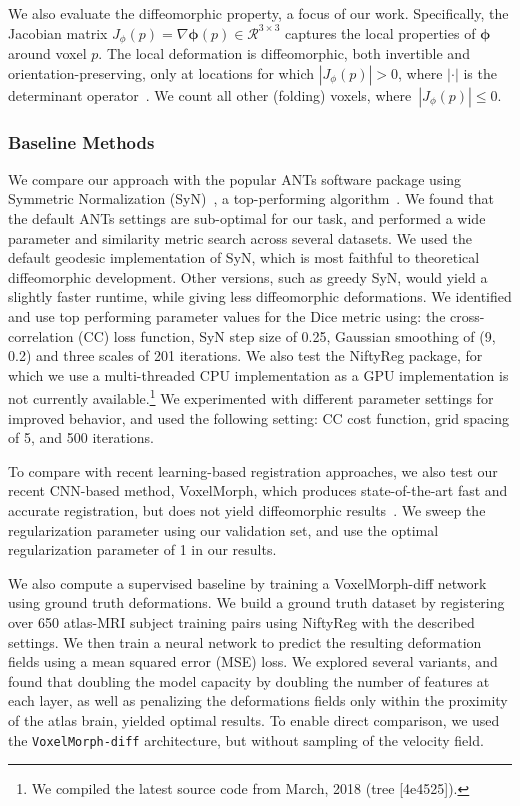 \documentclass{article}
\newcommand{\bphi}{\boldsymbol{\phi}}
\newcommand{\citep}{\cite}
\begin{document}
We also evaluate the diffeomorphic property, a focus of our work. Specifically, the Jacobian matrix \mbox{$J_{\phi}(p) = \nabla \bphi (p) \in \mathcal{R}^{3\times 3}$} captures the local properties of $\bphi$ around voxel $p$. The local deformation is diffeomorphic, both invertible and orientation-preserving, only at locations for which $|J_{\phi}(p)| > 0$, where $| \cdot |$ is the determinant operator~\citep{ashburner2007}.
We count all other (folding) voxels, where~$|J_{\phi}(p)| \le 0$.

\subsubsection{Baseline Methods} We compare our approach with the popular ANTs software package using Symmetric Normalization (SyN)~\citep{avants2008}, a top-performing algorithm~\citep{klein2009}.  {\color{blue}We
	found that the default ANTs settings are sub-optimal for our task,
	and performed a wide parameter and similarity metric search
	across several datasets. We used the default geodesic implementation of SyN, which is most faithful to theoretical diffeomorphic development. Other versions, such as greedy SyN, would yield a slightly faster runtime, while giving less diffeomorphic deformations. We identified and use top performing
	parameter values for the Dice metric using: the cross-correlation
	(CC) loss function, SyN step size of 0.25, Gaussian smoothing
	of (9, 0.2) and three scales of 201 iterations.} We also test the NiftyReg package, for which we use a multi-threaded CPU implementation as a GPU implementation is not currently available.\footnote{We compiled the latest source code from March, 2018 (tree [4e4525]).} We experimented with different parameter settings for improved behavior, and used the following setting: CC cost function, grid spacing of 5, and 500 iterations.

To compare with recent learning-based registration approaches, we also test our recent CNN-based method, VoxelMorph, which produces state-of-the-art fast and accurate registration, but does not yield diffeomorphic results~\citep{balakrishnan2018a, balakrishnan2019}. We sweep the regularization parameter using our validation set, and use the optimal regularization parameter of 1 in our results.

{\color{blue} We also compute a supervised baseline by training a VoxelMorph-diff network using ground truth deformations. We build a ground truth dataset by registering over 650 atlas-MRI subject training pairs using NiftyReg with the described settings. We then train a neural network to predict the resulting deformation fields using a mean squared error (MSE) loss. We explored several variants, and found that doubling the model capacity by doubling the number of features at each layer, as well as penalizing the deformations fields only within the proximity of the atlas brain, yielded optimal results. To enable direct comparison, we used the \verb|VoxelMorph-diff| architecture, but without sampling of the velocity field.}
\end{document}
